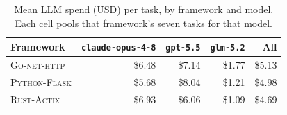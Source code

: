 \begin{table}[htbp]
  \centering
  \caption{Mean LLM spend (USD) per task, by framework and model. Each
    cell pools that framework's seven tasks for that model.}
  \label{tab:appendix-cost-env}
  \small
  \begin{tabular}{@{}lrrrr@{}}
    \toprule
    \textbf{Framework} & \textbf{\texttt{claude-opus-4-8}} & \textbf{\texttt{gpt-5.5}} & \textbf{\texttt{glm-5.2}} & \textbf{All} \\
    \midrule
    \textsc{Go-net-http}  & \$6.48 & \$7.14 & \$1.77 & \$5.13 \\
    \textsc{Python-Flask} & \$5.68 & \$8.04 & \$1.21 & \$4.98 \\
    \textsc{Rust-Actix}   & \$6.93 & \$6.06 & \$1.09 & \$4.69 \\
    \bottomrule
  \end{tabular}
\end{table}

\begin{table}[htbp]
  \centering
  \caption{Mean LLM spend (USD) per task, by scenario and model, ordered
    by the pooled mean. Each cell pools that scenario's three tasks for
    that model.}
  \label{tab:appendix-cost-scenario}
  \small
\end{table}

